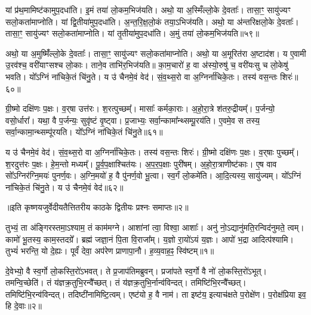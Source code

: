   यां प्र॑थ॒मामिष्ट॑कामुप॒दधा॑ति।
   इ॒मं तया॑ लो॒कम॒भिज॑यति।
   अथो॒ या अ॒स्मिँल्लो॒के दे॒वताः᳚।
   तासा॒ꣳ॒ सायु॑ज्यꣳ सलो॒कता॑माप्नोति।
   यां द्वि॒तीया॑मुप॒दधा॑ति।
   अ॒न्त॒रि॒क्ष॒लो॒कं तया॒ऽभिज॑यति।
   अथो॒ या अ॑न्तरिक्षलो॒के दे॒वताः᳚।
   तासा॒ꣳ॒ सायु॑ज्यꣳ सलो॒कता॑माप्नोति।
   यां तृ॒तीया॑मुप॒दधा॑ति।
   अ॒मुं तया॑ लो॒कम॒भिज॑यति॥५९॥

   अथो॒ या अ॒मुष्मिँ॑ल्लो॒के दे॒वताः᳚।
   तासा॒ꣳ॒ सायु॑ज्यꣳ सलो॒कता॑मा\-प्नोति।
   अथो॒ या अ॒मूरित॑रा अ॒ष्टाद॑श।
   य ए॒वामी उ॒रव॑श्च॒ वरी॑याꣳसश्च लो॒काः।
   ताने॒व ताभि॑र॒भिज॑यति॥
   का॒म॒चारो॑ ह॒ वा अ॑स्यो॒रुषु॑ च॒ वरी॑यःसु च लो॒केषु॑ भवति।
   यो᳚ऽग्निं ना॑चिके॒तं चि॑नु॒ते।
   य उ॑ चैनमे॒वं वेद॑।
   सं॒व॒थ्स॒रो वा अ॒ग्निर्ना॑चिके॒तः।
   तस्य॑ वस॒न्तः शिरः॑॥६०॥

   ग्री॒ष्मो दक्षि॑णः प॒क्षः।
   व॒र्{‌}षा उत्त॑रः।
   श॒रत्पुच्छम्᳚।
   मासाः᳚ कर्मका॒राः।
   अ॒हो॒रा॒त्रे श॑तरु॒द्रीयम्᳚।
   प॒र्जन्यो॒ वसो॒र्धारा᳚।
   यथा॒ वै प॒र्जन्यः॒ सुवृ॑ष्टं वृ॒ष्ट्वा।
   प्र॒जाभ्यः॒ सर्वा॒न्कामा᳚न्थ्सम्पू॒रय॑ति।
   ए॒वमे॒व स तस्य॒ सर्वा॒न्कामा॒न्थ्सम्पू॑रयति।
   यो᳚ऽग्निं ना॑चिके॒तं चि॑नु॒ते॥६१॥

   य उ॑ चैनमे॒वं वेद॑।
   सं॒व॒थ्स॒रो वा अ॒ग्निर्ना॑चिके॒तः।
   तस्य॑ वस॒न्तः शिरः॑।
   ग्री॒ष्मो दक्षि॑णः प॒क्षः।
   व॒र्{‌}षाः पुच्छम्᳚।
   श॒रदुत्त॑रः प॒क्षः।
   हे॒म॒न्तो मध्यम्᳚।
   पू॒र्व॒प॒क्षाश्चित॑यः।
   अ॒प॒र॒प॒क्षाः पुरी॑षम्।
   अ॒हो॒रा॒त्राणीष्ट॑काः।
   ए॒ष वाव सो᳚ऽग्निर॑ग्नि॒मयः॑ पुनर्ण॒वः।
   अ॒ग्नि॒मयो॑ ह॒ वै पु॑नर्ण॒वो भू॒त्वा।
   स्व॒र्गं लो॒कमे॑ति।
   आ॒दि॒त्यस्य॒ सायु॑ज्यम्।
   यो᳚ऽग्निं ना॑चिके॒तं चि॑नु॒ते।
   य उ॑ चैनमे॒वं वेद॑॥६२॥
\anuvakamend

  ॥इति कृष्णयजुर्वेदीयतैत्तितरीय काठके द्वितीयः प्रश्नः समाप्तः॥२॥


\setcounter{anuvakam}{0}

   तुभ्यं॒ ता अ॑ङ्गिरस्तमा॒ऽश्याम॒ तं काम॑मग्ने।
   आशा॑नां त्वा॒ विश्वा॒ आशाः᳚।
   अनु॑ नो॒ऽद्यानु॑मति॒रन्विद॑नुमते॒ त्वम्।
   कामो॑ भू॒तस्य॒ काम॒स्तदग्रे᳚।
   ब्रह्म॑ जज्ञा॒नं पि॒ता वि॒राजा᳚म्।
   य॒ज्ञो रा॒यो॑ऽयं य॒ज्ञः।
   आपो॑ भ॒द्रा आदित्प॑श्यामि।
   तुभ्यं॑ भरन्ति॒ यो दे॒ह्यः।
   पूर्वं॑ देवा॒ अप॑रेण प्राणापा॒नौ।
   ह॒व्य॒वाह॒ꣴ॒ स्वि॑ष्टम्॥१॥\anuvakamend
  

   दे॒वेभ्यो॒ वै स्व॒र्गो लो॒कस्ति॒रो॑ऽभवत्।
   ते प्र॒जाप॑तिमब्रुवन्।
   प्रजा॑पते स्व॒र्गो वै नो॑ लो॒कस्ति॒रो॑ऽभूत्।
   तमन्वि॒च्छेति॑।
   तं य॑ज्ञक्र॒तुभि॒रन्वै᳚च्छत्।
   तं य॑ज्ञक्र॒तुभि॒र्नान्व॑विन्दत्।
   तमिष्टि॑भि॒रन्वै᳚च्छत्।
   तमिष्टि॑भि॒रन्व॑विन्दत्।
   तदिष्टी॑नामिष्टि॒\-त्वम्।
   एष्ट॑यो ह॒ वै नाम॑।
   ता इष्ट॑य॒ इत्याच॑क्षते प॒रोक्षे॑ण।
   प॒रोक्ष॑प्रिया इव॒ हि दे॒वाः॥२॥

